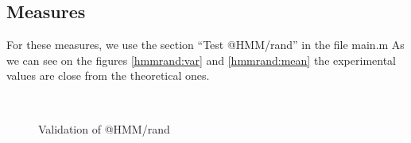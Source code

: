 \documentclass[a4paper]{report}
\begin{document}
\subsection{Measures}
For these measures, we use the section ``Test @HMM/rand'' in the file main.m
As we can see on the figures \ref{hmmrand:var} and \ref{hmmrand:mean} the experimental values are close from the theoretical ones.
\begin{figure}[!h]
\centering
    \\
\captionsetup{justification=centering}
    \caption{Validation of @HMM/rand\\\color{blue}{Blue : Plot of the 20 attempts}\\\color{red}{Red : Mean over the 20 attempts}}
\end{figure}
\end{document}
